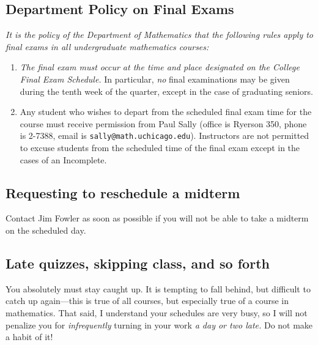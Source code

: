 \documentclass[12pt,letterpaper]{article}
\begin{document}
\subsection*{Department Policy on Final Exams}

\textit{It is the policy of the Department of Mathematics that the
following rules apply to final exams in all undergraduate mathematics
courses:}
\begin{enumerate}
\item \textit{The final exam must occur at the time and place designated on
the College Final Exam Schedule.}  In particular, \textit{no} final examinations
may be given during the tenth week of the quarter, except in the case
of graduating seniors.
\item Any student who wishes to depart from the scheduled final exam
time for the course must receive permission from Paul Sally (office is
Ryerson 350, phone is 2-7388, email is
\texttt{sally@math.uchicago.edu}).  Instructors are not permitted to
excuse students from the scheduled time of the final exam except in
the cases of an Incomplete.
\end{enumerate}

\subsection*{Requesting to reschedule a midterm}

Contact Jim Fowler as soon as possible if you will not be able to take
a midterm on the scheduled day.

\subsection*{Late quizzes, skipping class, and so forth}

You absolutely must stay caught up.  It is tempting to fall behind,
but difficult to catch up again---this is true of all courses, but
especially true of a course in mathematics.  That said, I understand
your schedules are very busy, so I will not penalize you for
\textit{infrequently} turning in your work \textit{a day or two late.}
Do not make a habit of it!
\end{document}
